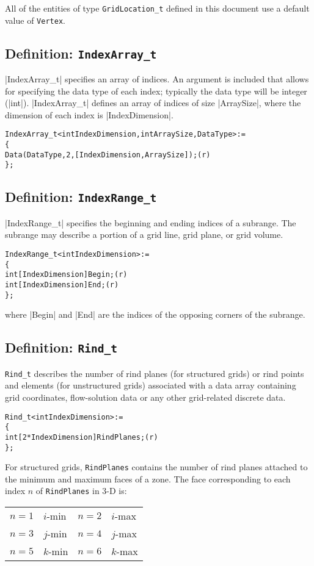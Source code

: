All of the entities of type \texttt{GridLocation\_t} defined in this
document use a default value of \texttt{Vertex}.

\subsection{Definition: \texttt{IndexArray\_t}}
\label{s:IndexArray}

|IndexArray_t| specifies an array of indices.  An argument is included that 
allows for specifying the data type of each index; typically the data type
will be integer (|int|).  |IndexArray_t| defines an array of indices of size 
|ArraySize|, where the dimension of each index is |IndexDimension|.
\begin{alltt}
  IndexArray\_t< int IndexDimension, int ArraySize, DataType > :=
    \{
    Data( DataType, 2, [IndexDimension,ArraySize] ) ;                       (r)
    \} ;
\end{alltt}

\subsection{Definition: \texttt{IndexRange\_t}}
\label{s:IndexRange}

|IndexRange_t| specifies the beginning and ending indices of a subrange.
The subrange may describe a portion of a grid line, grid plane, or grid
volume.
\begin{alltt}
  IndexRange\_t< int IndexDimension > :=
    \{
    int[IndexDimension] Begin ;                                             (r)
    int[IndexDimension] End ;                                               (r)
    \} ;
\end{alltt}
where |Begin| and |End| are the indices of the opposing corners of the
subrange.

\subsection{Definition: \texttt{Rind\_t}} 
\label{s:Rind}

\texttt{Rind\_t} describes the number of rind planes (for structured
grids) or rind points and elements (for unstructured grids) associated
with a data array containing grid coordinates, flow-solution data or any
other grid-related discrete data.
\begin{alltt}
  Rind\_t< int IndexDimension > :=
    \{
    int[2*IndexDimension] RindPlanes ;                                      (r)
    \} ;
\end{alltt}
For structured grids, \texttt{RindPlanes} contains the number of rind
planes attached to the minimum and maximum faces of a zone.
The face corresponding to each index $n$ of \texttt{RindPlanes} in 3-D is:
\begin{center}
\begin{tabular}{r@{\ $\rightarrow$ \ }l@{\qquad\qquad}r@{\ $\rightarrow$ \ }l}
  $n = 1$ & $i$-min  &  $n = 2$ & $i$-max \\
  $n = 3$ & $j$-min  &  $n = 4$ & $j$-max \\
  $n = 5$ & $k$-min  &  $n = 6$ & $k$-max
\end{tabular}
\end{center}

